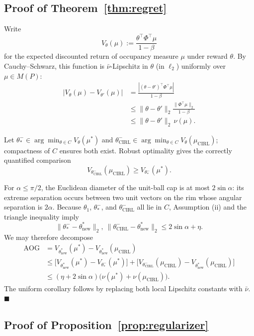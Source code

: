 \documentclass{article}
\begin{document}
\subsection{Proof of Theorem~\ref{thm:regret}}
\label{app:proof-regret}

Write
\[
V_\theta(\mu) := \frac{\theta^\top\Phi^\top\mu}{1-\beta}
\]
for the expected discounted return of occupancy measure $\mu$ under reward $\theta$. By Cauchy--Schwarz, this function is $\bar\nu$-Lipschitz in $\theta$ (in $\ell_2$) uniformly over $\mu\in M(P)$:
\begin{align*}
|V_\theta(\mu) - V_{\theta'}(\mu)| &= \frac{|(\theta-\theta')^\top \Phi^\top\mu|}{1-\beta} \\
&\leq \|\theta-\theta'\|_2 \frac{\|\Phi^\top\mu\|_2}{1-\beta} \\
&\leq \|\theta-\theta'\|_2 \,\nu(\mu).
\end{align*}

Let $\theta^-_*\in\arg\min_{\theta\in C}V_\theta(\mu^*)$ and
$\theta^-_{\mathrm{CIRL}}\in\arg\min_{\theta\in C}
V_\theta(\mu_{\mathrm{CIRL}})$; compactness of $C$ ensures both exist. Robust
optimality gives the correctly quantified comparison
\[
V_{\theta^-_{\mathrm{CIRL}}}(\mu_{\mathrm{CIRL}})
\ge V_{\theta^-_*}(\mu^*).
\]

For $\alpha\le\pi/2$, the Euclidean diameter of the unit-ball cap is at most
$2\sin\alpha$: its extreme separation occurs between two unit vectors on the
rim whose angular separation is $2\alpha$. Because $\theta_1$, $\theta^-_*$,
and $\theta^-_{\mathrm{CIRL}}$ all lie in $C$, Assumption (ii) and the triangle
inequality imply
\[
\|\theta^-_*-\theta^*_{\mathrm{new}}\|_2,
\ \|\theta^-_{\mathrm{CIRL}}-\theta^*_{\mathrm{new}}\|_2
\le 2\sin\alpha+\eta.
\]
We may therefore decompose
\begin{align*}
\mathrm{AOG}
&=V_{\theta^*_{\mathrm{new}}}(\mu^*)
  -V_{\theta^*_{\mathrm{new}}}(\mu_{\mathrm{CIRL}})\\
&\le
  \big[V_{\theta^*_{\mathrm{new}}}(\mu^*)-V_{\theta^-_*}(\mu^*)\big]
  +\big[V_{\theta^-_{\mathrm{CIRL}}}(\mu_{\mathrm{CIRL}})
       -V_{\theta^*_{\mathrm{new}}}(\mu_{\mathrm{CIRL}})\big]\\
&\le (\eta+2\sin\alpha)
  \big(\nu(\mu^*)+\nu(\mu_{\mathrm{CIRL}})\big).
\end{align*}
The uniform corollary follows by replacing both local Lipschitz constants with
$\bar\nu$. $\blacksquare$

\subsection{Proof of Proposition~\ref{prop:regularizer}}
\label{app:proof-regularizer}
\end{document}
